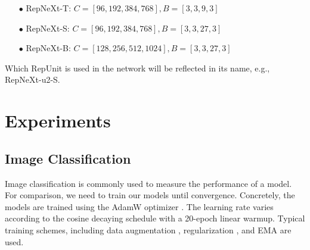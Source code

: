\documentclass[preprint,12pt]{elsarticle}
\begin{document}
\begin{enumerate}
\small
\item[$\bullet$] RepNeXt-T: $C=[96,192,384,768], B=[3,3,9,3]$
\item[$\bullet$] RepNeXt-S: $C=[96,192,384,768], B=[3,3,27,3]$
\item[$\bullet$] RepNeXt-B: $C=[128,256,512,1024], B=[3,3,27,3]$
\end{enumerate}

Which RepUnit is used in the network will be reflected in its name, e.g., RepNeXt-u2-S.

\section{Experiments}
\label{sec:experiments}

\subsection{Image Classification}

Image classification is commonly used to measure the performance of a model. For comparison, we need to train our models until convergence. Concretely, the models are trained using the AdamW optimizer \cite{adamw}. The learning rate varies according to the cosine decaying schedule with a 20-epoch linear warmup. Typical training schemes, including data augmentation \cite{mixup,cutmix,randaug}, regularization \cite{depth}, and EMA \cite{ema} are used.
\end{document}

